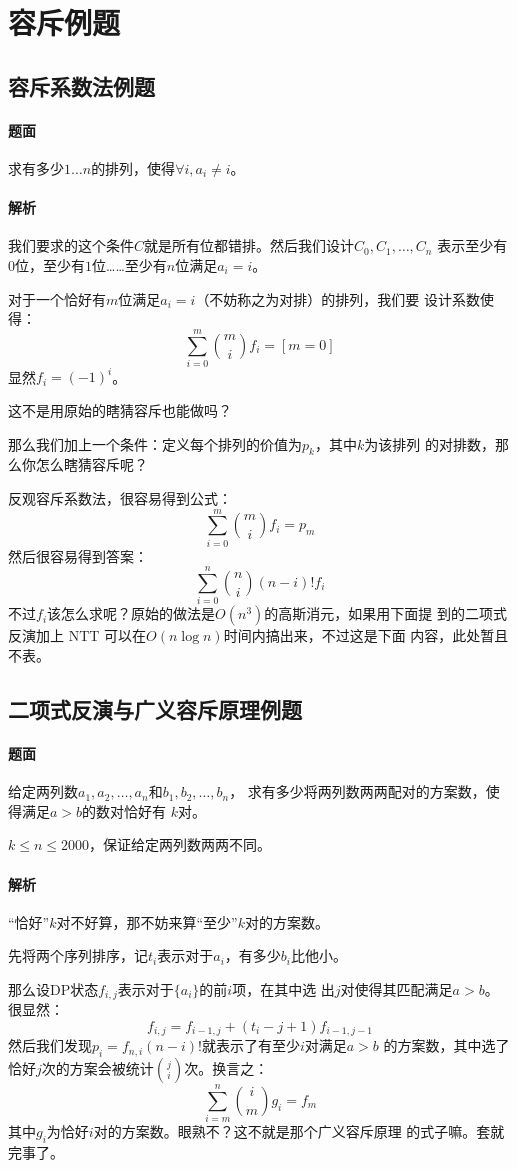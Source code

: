 \section{容斥例题}
\subsection{容斥系数法例题}
\paragraph{题面}
求有多少\(1\ldots n\)的排列，使得\(\forall i, a_i\ne i\)。
\paragraph{解析}
我们要求的这个条件$C$就是所有位都错排。然后我们设计$C_0, C_1, \ldots, C_n$
表示至少有$0$位，至少有$1$位……至少有$n$位满足$a_i = i$。\par
对于一个恰好有$m$位满足$a_i = i$（不妨称之为对排）的排列，我们要
设计系数使得：
\[\sum_{i = 0}^m\binom m i f_i = [m = 0]\]
显然$f_i = (-1)^i$。\par
这不是用原始的瞎猜容斥也能做吗？\par
那么我们加上一个条件：定义每个排列的价值为$p_k$，其中$k$为该排列
的对排数，那么你怎么瞎猜容斥呢？\par
反观容斥系数法，很容易得到公式：
\[\sum_{i = 0}^m\binom m i f_i = p_m\]
然后很容易得到答案：
\[\sum_{i = 0}^n\binom n i (n - i)! f_i\]
不过$f_i$该怎么求呢？原始的做法是$O(n^3)$的高斯消元，如果用下面提
到的二项式反演加上 NTT 可以在$O(n\log n)$时间内搞出来，不过这是下面
内容，此处暂且不表。
\subsection{二项式反演与广义容斥原理例题}
\paragraph{题面}
给定两列数$a_1, a_2, \ldots, a_n$和$b_1, b_2, \ldots, b_n$，
求有多少将两列数两两配对的方案数，使得满足$a > b$的数对恰好有
$k$对。\par
$k\le n\le 2000$，保证给定两列数两两不同。
\paragraph{解析}
“恰好”$k$对不好算，那不妨来算“至少”$k$对的方案数。\par
先将两个序列排序，记$t_i$表示对于$a_i$，有多少$b_i$比他小。\par
那么设DP状态$f_{i, j}$表示对于$\{a_i\}$的前\(i\)项，在其中选
出$j$对使得其匹配满足$a > b$。很显然：
\[f_{i, j} = f_{i - 1, j} + (t_i - j + 1)f_{i - 1, j - 1}\]
然后我们发现$p_i = f_{n, i}(n - i)!$就表示了有至少$i$对满足$a > b$
的方案数，其中选了恰好$j$次的方案会被统计$\binom j i$次。换言之：
\[\sum_{i = m}^n \binom i m g_i = f_m\]
其中$g_i$为恰好$i$对的方案数。眼熟不？这不就是那个广义容斥原理
的式子嘛。套就完事了。
